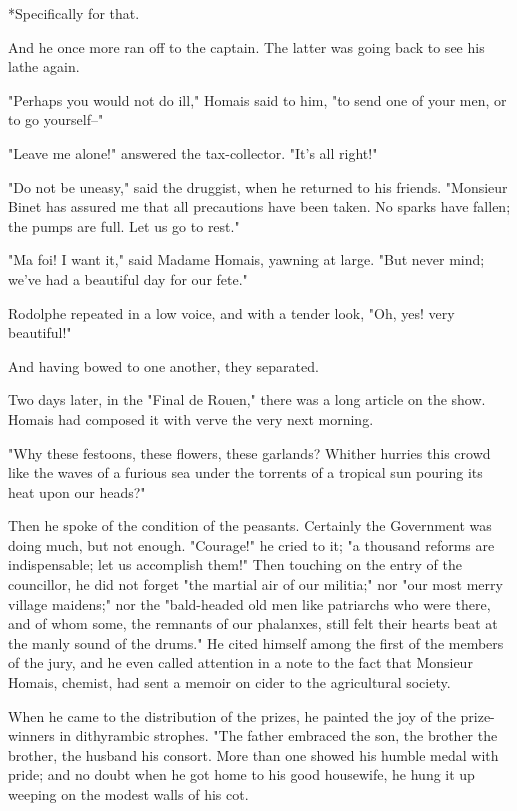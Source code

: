 \documentclass{tufte-book}
\begin{document}
     *Specifically for that.

And he once more ran off to the captain. The latter was going back to
see his lathe again.

"Perhaps you would not do ill," Homais said to him, "to send one of your
men, or to go yourself--"

"Leave me alone!" answered the tax-collector. "It's all right!"

"Do not be uneasy," said the druggist, when he returned to his friends.
"Monsieur Binet has assured me that all precautions have been taken. No
sparks have fallen; the pumps are full. Let us go to rest."

"Ma foi! I want it," said Madame Homais, yawning at large. "But never
mind; we've had a beautiful day for our fete."

Rodolphe repeated in a low voice, and with a tender look, "Oh, yes! very
beautiful!"

And having bowed to one another, they separated.

Two days later, in the "Final de Rouen," there was a long article on the
show. Homais had composed it with verve the very next morning.

"Why these festoons, these flowers, these garlands? Whither hurries this
crowd like the waves of a furious sea under the torrents of a tropical
sun pouring its heat upon our heads?"

Then he spoke of the condition of the peasants. Certainly the Government
was doing much, but not enough. "Courage!" he cried to it; "a thousand
reforms are indispensable; let us accomplish them!" Then touching on
the entry of the councillor, he did not forget "the martial air of our
militia;" nor "our most merry village maidens;" nor the "bald-headed old
men like patriarchs who were there, and of whom some, the remnants of
our phalanxes, still felt their hearts beat at the manly sound of the
drums." He cited himself among the first of the members of the jury,
and he even called attention in a note to the fact that Monsieur Homais,
chemist, had sent a memoir on cider to the agricultural society.

When he came to the distribution of the prizes, he painted the joy of
the prize-winners in dithyrambic strophes. "The father embraced the son,
the brother the brother, the husband his consort. More than one showed
his humble medal with pride; and no doubt when he got home to his good
housewife, he hung it up weeping on the modest walls of his cot.
\end{document}
